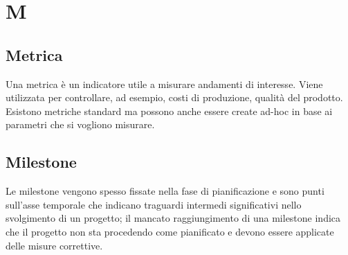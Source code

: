 \section{M}

    \subsection*{Metrica}

        Una metrica è un indicatore utile a misurare andamenti di interesse.
        Viene utilizzata per controllare, ad esempio, costi di produzione, qualità del prodotto.
        Esistono metriche standard ma possono anche essere create ad-hoc in base ai parametri che si 
        vogliono misurare.

	\subsection*{Milestone}
	
		Le milestone vengono spesso fissate nella fase di pianificazione e sono punti sull'asse temporale che indicano traguardi intermedi significativi nello svolgimento di un progetto; il mancato raggiungimento di una milestone indica che il progetto non sta procedendo come pianificato e devono essere applicate delle misure correttive.


